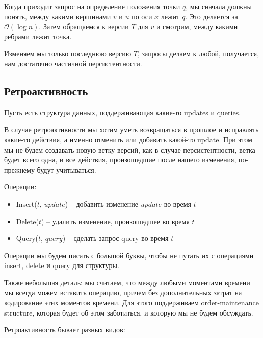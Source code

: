 Когда приходит запрос на определение положения точки $q$, мы сначала должны понять, между какими вершинами $v$ и $u$ по оси $x$ лежит $q$. 
Это делается за $\mathcal{O}(\log n)$.
Затем обращаемся к версии $T$ для $v$ и смотрим, между какими ребрами лежит точка.

Изменяем мы только последнюю версию $T$, запросы делаем к любой, получается, нам достаточно частичной персистентности.

\subsection{Ретроактивность}

Пусть есть структура данных, поддерживающая какие-то updates и queries.

В случае ретроактивности мы хотим уметь возвращаться в прошлое и исправлять какие-то действия, а именно отменить или добавить какой-то update.
При этом мы не будем создавать новую ветку версий, как в случае персистентности, ветка будет всего одна, и все действия, произошедшие после нашего изменения, по-прежнему будут учитываться.

Операции:

\begin{itemize}

\item Insert($t$, $update$) -- добавить изменение $update$ во время $t$
\item Delete($t$) -- удалить изменение, произошедшее во время $t$
\item Query($t$, $query$) -- сделать запрос query во время $t$

\end{itemize}

Операции мы будем писать с большой буквы, чтобы не путать их с операциями insert, delete и query для структуры.

Также небольшая деталь: мы считаем, что между любыми моментами времени мы всегда можем вставить операцию, причем без дополнительных затрат на кодирование этих моментов времени.
Для этого поддерживаем order-maintenance structure, которая будет об этом заботиться, и которую мы не будем обсуждать.

Ретроактивность бывает разных видов:

